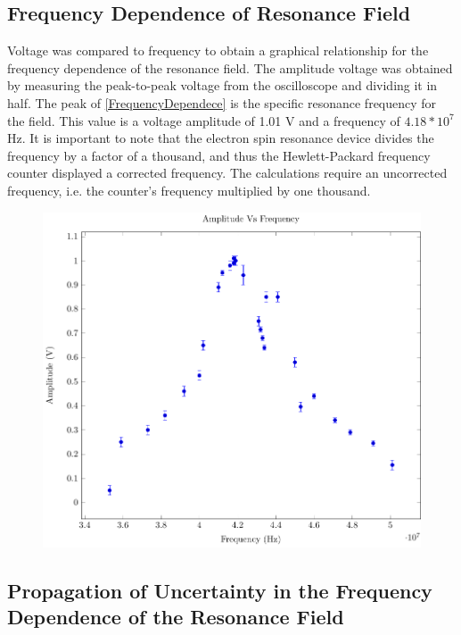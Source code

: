 \documentclass[a4paper]{article}
\begin{document}
\subsection{Frequency Dependence of Resonance Field}

\qq Voltage was compared to frequency to obtain a graphical
relationship for the frequency dependence of the resonance field. The
amplitude voltage was obtained by measuring the peak-to-peak voltage
from the oscilloscope and dividing it in half. The peak of
\ref{FrequencyDependece} is the specific resonance frequency for the
field. This value is a voltage amplitude of 1.01 V and a frequency of
$4.18*10^7$ Hz. It is important to note that the electron spin
resonance device divides the frequency by a factor of a thousand, and
thus the Hewlett-Packard frequency counter displayed a corrected
frequency. The calculations require an uncorrected frequency, i.e. the
counter's frequency multiplied by one thousand.
\begin{figure}[H]
\centering
\includegraphics[scale=1.0]{Plots/ExpFreqVsVolt/freq_depen.pdf}
\label{FrequencyDependence}
\end{figure}

\subsection{Propagation of Uncertainty in the Frequency Dependence of the Resonance Field}
\end{document}
